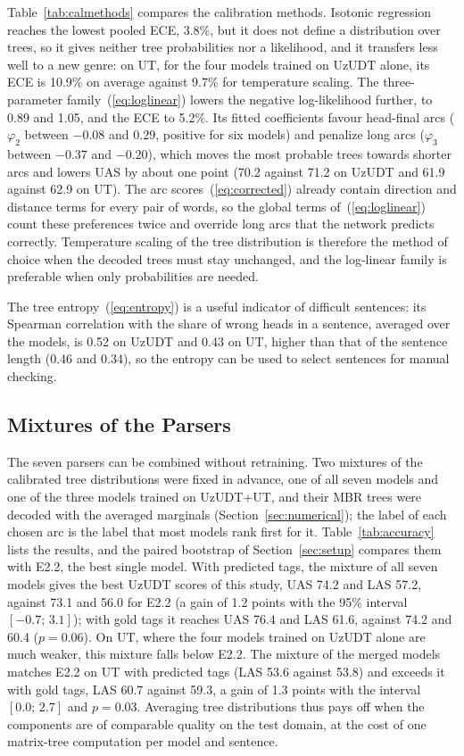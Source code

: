 \documentclass[mathematics,article,submit,pdftex,oneauthor]{Definitions/mdpi}
\begin{document}
Table~\ref{tab:calmethods} compares the calibration methods.
Isotonic regression reaches the lowest pooled ECE, 3.8\%, but it does not define a distribution over trees, so it gives neither tree probabilities nor a likelihood, and it transfers less well to a new genre: on UT, for the four models trained on UzUDT alone, its ECE is 10.9\% on average against 9.7\% for temperature scaling.
The three-parameter family~(\ref{eq:loglinear}) lowers the negative log-likelihood further, to 0.89 and 1.05, and the ECE to 5.2\%.
Its fitted coefficients favour head-final arcs ($\varphi_2$ between $-0.08$ and $0.29$, positive for six models) and penalize long arcs ($\varphi_3$ between $-0.37$ and $-0.20$), which moves the most probable trees towards shorter arcs and lowers UAS by about one point (70.2 against 71.2 on UzUDT and 61.9 against 62.9 on UT).
The arc scores~(\ref{eq:corrected}) already contain direction and distance terms for every pair of words, so the global terms of~(\ref{eq:loglinear}) count these preferences twice and override long arcs that the network predicts correctly.
Temperature scaling of the tree distribution is therefore the method of choice when the decoded trees must stay unchanged, and the log-linear family is preferable when only probabilities are needed.



The tree entropy~(\ref{eq:entropy}) is a useful indicator of difficult sentences: its Spearman correlation with the share of wrong heads in a sentence, averaged over the models, is 0.52 on UzUDT and 0.43 on UT, higher than that of the sentence length (0.46 and 0.34), so the entropy can be used to select sentences for manual checking.

\subsection{Mixtures of the Parsers}\label{sec:mixture}
The seven parsers can be combined without retraining.
Two mixtures of the calibrated tree distributions were fixed in advance, one of all seven models and one of the three models trained on UzUDT+UT, and their MBR trees were decoded with the averaged marginals (Section~\ref{sec:numerical}); the label of each chosen arc is the label that most models rank first for it.
Table~\ref{tab:accuracy} lists the results, and the paired bootstrap of Section~\ref{sec:setup} compares them with E2.2, the best single model.
With predicted tags, the mixture of all seven models gives the best UzUDT scores of this study, UAS 74.2 and LAS 57.2, against 73.1 and 56.0 for E2.2 (a gain of 1.2 points with the 95\% interval $[-0.7;\,3.1]$); with gold tags it reaches UAS 76.4 and LAS 61.6, against 74.2 and 60.4 ($p=0.06$).
On UT, where the four models trained on UzUDT alone are much weaker, this mixture falls below E2.2.
The mixture of the merged models matches E2.2 on UT with predicted tags (LAS 53.6 against 53.8) and exceeds it with gold tags, LAS 60.7 against 59.3, a gain of 1.3 points with the interval $[0.0;\,2.7]$ and $p=0.03$.
Averaging tree distributions thus pays off when the components are of comparable quality on the test domain, at the cost of one matrix-tree computation per model and sentence.
\end{document}
